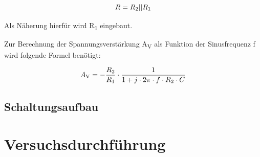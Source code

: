 \begin{equation}
    R = R\textsubscript{2}|| R\textsubscript{1}
    \label{eq:R}
\end{equation}

Als Näherung hierfür wird R\textsubscript{1} eingebaut.

Zur Berechnung der Spannungsverstärkung A\textsubscript{V} als
Funktion der Sinusfrequenz f wird folgende Formel benötigt:

\begin{equation}
    A\textsubscript{V} = -\frac{R\textsubscript{2}}{R\textsubscript{1}} \cdot \frac{1}{1 + j \cdot 2 \pi \cdot f \cdot R\textsubscript{2} \cdot C}
    \label{eq:AV}
\end{equation}

\subsection{Schaltungsaufbau}

\section{Versuchsdurchführung}